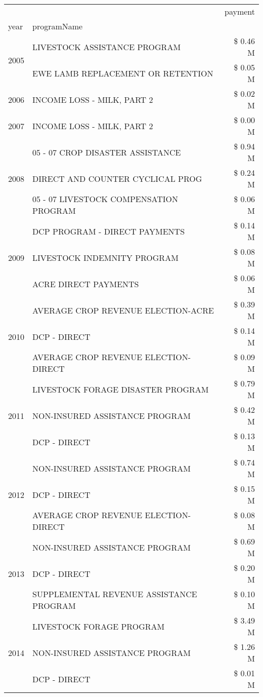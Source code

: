 \begin{tabular}{llr}
\toprule
 &  & payment \\
year & programName &  \\
\midrule
\multirow[t]{2}{*}{2005} & LIVESTOCK ASSISTANCE PROGRAM & \$ 0.46 M \\
 & EWE LAMB REPLACEMENT OR RETENTION & \$ 0.05 M \\
\cline{1-3}
2006 & INCOME LOSS - MILK, PART 2 & \$ 0.02 M \\
\cline{1-3}
2007 & INCOME LOSS - MILK, PART 2 & \$ 0.00 M \\
\cline{1-3}
\multirow[t]{3}{*}{2008} & 05 - 07 CROP DISASTER ASSISTANCE & \$ 0.94 M \\
 & DIRECT AND COUNTER CYCLICAL PROG & \$ 0.24 M \\
 & 05 - 07 LIVESTOCK COMPENSATION PROGRAM & \$ 0.06 M \\
\cline{1-3}
\multirow[t]{3}{*}{2009} & DCP PROGRAM - DIRECT PAYMENTS & \$ 0.14 M \\
 & LIVESTOCK INDEMNITY PROGRAM & \$ 0.08 M \\
 & ACRE DIRECT PAYMENTS & \$ 0.06 M \\
\cline{1-3}
\multirow[t]{3}{*}{2010} & AVERAGE CROP REVENUE ELECTION-ACRE & \$ 0.39 M \\
 & DCP - DIRECT & \$ 0.14 M \\
 & AVERAGE CROP REVENUE ELECTION-DIRECT & \$ 0.09 M \\
\cline{1-3}
\multirow[t]{3}{*}{2011} & LIVESTOCK FORAGE DISASTER PROGRAM & \$ 0.79 M \\
 & NON-INSURED ASSISTANCE PROGRAM & \$ 0.42 M \\
 & DCP - DIRECT & \$ 0.13 M \\
\cline{1-3}
\multirow[t]{3}{*}{2012} & NON-INSURED ASSISTANCE PROGRAM & \$ 0.74 M \\
 & DCP - DIRECT & \$ 0.15 M \\
 & AVERAGE CROP REVENUE ELECTION-DIRECT & \$ 0.08 M \\
\cline{1-3}
\multirow[t]{3}{*}{2013} & NON-INSURED ASSISTANCE PROGRAM & \$ 0.69 M \\
 & DCP - DIRECT & \$ 0.20 M \\
 & SUPPLEMENTAL REVENUE ASSISTANCE PROGRAM & \$ 0.10 M \\
\cline{1-3}
\multirow[t]{3}{*}{2014} & LIVESTOCK FORAGE PROGRAM & \$ 3.49 M \\
 & NON-INSURED ASSISTANCE PROGRAM & \$ 1.26 M \\
 & DCP - DIRECT & \$ 0.01 M \\

\end{tabular}
